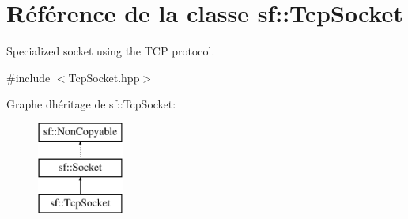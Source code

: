 \hypertarget{classsf_1_1TcpSocket}{}\section{Référence de la classe sf\+:\+:Tcp\+Socket}
\label{classsf_1_1TcpSocket}


Specialized socket using the T\+CP protocol.  




{\ttfamily \#include $<$Tcp\+Socket.\+hpp$>$}

Graphe d\textquotesingle{}héritage de sf\+:\+:Tcp\+Socket\+:\begin{figure}[H]
\begin{center}
\leavevmode
\includegraphics[height=3.000000cm]{classsf_1_1TcpSocket}
\end{center}
\end{figure}
